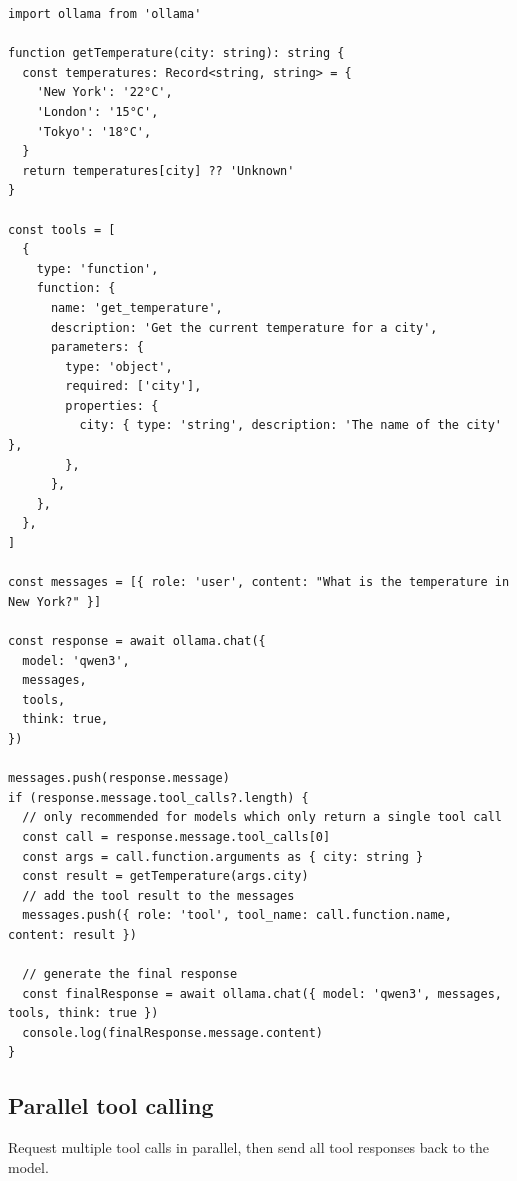 \documentclass[12pt,UTF8]{ctexbook}
\begin{document}
\begin{verbatim}
import ollama from 'ollama'

function getTemperature(city: string): string {
  const temperatures: Record<string, string> = {
    'New York': '22°C',
    'London': '15°C',
    'Tokyo': '18°C',
  }
  return temperatures[city] ?? 'Unknown'
}

const tools = [
  {
    type: 'function',
    function: {
      name: 'get_temperature',
      description: 'Get the current temperature for a city',
      parameters: {
        type: 'object',
        required: ['city'],
        properties: {
          city: { type: 'string', description: 'The name of the city' },
        },
      },
    },
  },
]

const messages = [{ role: 'user', content: "What is the temperature in New York?" }]

const response = await ollama.chat({
  model: 'qwen3',
  messages,
  tools,
  think: true,
})

messages.push(response.message)
if (response.message.tool_calls?.length) {
  // only recommended for models which only return a single tool call
  const call = response.message.tool_calls[0]
  const args = call.function.arguments as { city: string }
  const result = getTemperature(args.city)
  // add the tool result to the messages
  messages.push({ role: 'tool', tool_name: call.function.name, content: result })

  // generate the final response
  const finalResponse = await ollama.chat({ model: 'qwen3', messages, tools, think: true })
  console.log(finalResponse.message.content)
}
\end{verbatim}

\subsection{Parallel tool calling}

Request multiple tool calls in parallel, then send all tool responses back to the model.
\end{document}
